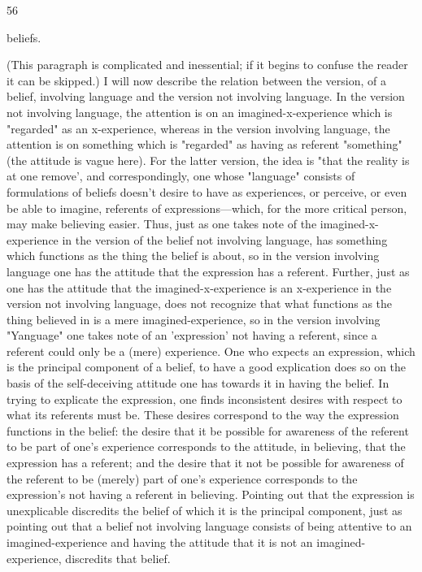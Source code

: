 \documentclass[10pt,twoside]{memoir}
\begin{document}
\begin{enumerate}
{{{{{{{{{{{{{{{56 


beliefs. 

(This paragraph is complicated and inessential; if it begins to confuse 
the reader it can be skipped.) I will now describe the relation between the 
version, of a belief, involving language and the version not involving 
language. In the version not involving language, the attention is on an 
imagined-x-experience which is "regarded" as an x-experience, whereas in 
the version involving language, the attention is on something which is 
"regarded" as having as referent "something" (the attitude is vague here). 
For the latter version, the idea is "that the reality is at one remove', and 
correspondingly, one whose "language" consists of formulations of beliefs 
doesn't desire to have as experiences, or perceive, or even be able to imagine, 
referents of expressions---which, for the more critical person, may make 
believing easier. Thus, just as one takes note of the imagined-x-experience in 
the version of the belief not involving language, has something which 
functions as the thing the belief is about, so in the version involving language 
one has the attitude that the expression has a referent. Further, just as one 
has the attitude that the imagined-x-experience is an x-experience in the 
version not involving language, does not recognize that what functions as the 
thing believed in is a mere imagined-experience, so in the version involving 
"Yanguage" one takes note of an 'expression' not having a referent, since a 
referent could only be a (mere) experience. One who expects an expression, 
which is the principal component of a belief, to have a good explication does 
so on the basis of the self-deceiving attitude one has towards it in having the 
belief. In trying to explicate the expression, one finds inconsistent desires 
with respect to what its referents must be. These desires correspond to the 
way the expression functions in the belief: the desire that it be possible for 
awareness of the referent to be part of one's experience corresponds to the 
attitude, in believing, that the expression has a referent; and the desire that it 
not be possible for awareness of the referent to be (merely) part of one's 
experience corresponds to the expression's not having a referent in believing. 
Pointing out that the expression is unexplicable discredits the belief of which 
it is the principal component, just as pointing out that a belief not involving 
language consists of being attentive to an imagined-experience and having the 
attitude that it is not an imagined-experience, discredits that belief. 

}}}}}}}}}}}}}}}
\end{enumerate}
\end{document}
